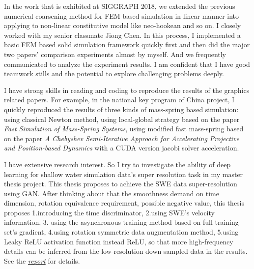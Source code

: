 \documentclass[a4paper,12pt]{article}
\begin{document}
In the work that is exhibited at SIGGRAPH 2018, we extended the previous numerical coarsening method for FEM based simulation in linear manner into applying to non-linear constitutive model like neo-hookean and so on. I closely worked with my senior classmate Jiong Chen. In this process, I implemented a basic FEM based solid simulation framework quickly first and then did the major two papers' comparison experiments almost by myself. And we frequently communicated to analyze the experiment results. I am confident that I have good teamwork stills and the potential to explore challenging problems deeply.\vspace{1.2ex}

I have strong skills in reading and coding to reproduce the results of the graphics related papers. For example, in the national key program of China project, I quickly reproduced the results of three kinds of mass-spring based simulation: using classical Newton method, using local-global strategy based on the paper \textit{Fast Simulation of Mass-Spring Systems}, using modified fast mass-spring based on the paper \textit{A Chebyshev Semi-Iterative Approach for Accelerating Projective and Position-based Dynamics} with a CUDA version jacobi solver acceleration.\vspace{1.2ex} %

I have extensive research interest. So I try to investigate the ability of deep learning for shallow water simulation data's super resolution task in my master thesis project. This thesis proposes to achieve the SWE data super-resolution using GAN. After thinking about that the smoothness demand on time dimension, rotation equivalence requirement, possible negative value, this thesis proposes 1.introducing the time discriminator, 2.using SWE's velocity information, 3. using the asynchronous training method based on full training set's gradient, 4.using rotation symmetric data augmentation method, 5.using Leaky ReLU activation function instead ReLU, so that more high-frequency details can be inferred from the low-resolution down sampled data in the results. See the \textit{\href{https://wtyatzoo.github.io/reports/SWE.pdf}{report}} for details.\vspace{1.2ex}  %
\end{document}
